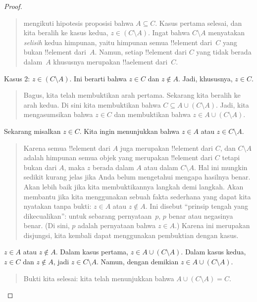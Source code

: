 \documentclass[../../../include/open-logic-section]{subfiles}
\begin{document}
\begin{proof}
\begin{quote}
    mengikuti hipotesis proposisi bahwa $A \subseteq C$. Kasus pertama
    selesai, dan kita beralih ke kasus kedua, $z \in (C \setminus A)$.
    Ingat bahwa $C \setminus A$ menyatakan \emph{selisih} kedua
    himpunan, yaitu himpunan semua !!{element} dari~$C$ yang bukan
    !!{element} dari~$A$. Namun, setiap !!{element} dari $C$ yang tidak
    berada dalam~$A$ khususnya merupakan !!a{element} dari~$C$.
  \end{quote}
  Kasus 2: $z \in (C \setminus A)$. Ini berarti bahwa $z \in C$ dan $z
  \notin A$. Jadi, khususnya, $z \in C$.
  \begin{quote}
    Bagus, kita telah membuktikan arah pertama. Sekarang kita beralih
    ke arah kedua. Di sini kita membuktikan bahwa $C \subseteq A \cup
    (C \setminus A)$. Jadi, kita mengasumsikan bahwa $z \in C$ dan
    membuktikan bahwa $z \in A \cup (C \setminus A)$.
  \end{quote}
  Sekarang misalkan $z \in C$. Kita ingin menunjukkan bahwa $z \in A$
  atau $z \in C \setminus A$.
  \begin{quote}
    Karena semua !!{element} dari $A$ juga merupakan !!{element} dari
    $C$, dan $C \setminus A$ adalah himpunan semua objek yang merupakan
    !!{element} dari $C$ tetapi bukan dari $A$, maka $z$ berada dalam
    $A$ atau dalam $C \setminus A$. Hal ini mungkin sedikit kurang
    jelas jika Anda belum mengetahui mengapa hasilnya benar. Akan
    lebih baik jika kita membuktikannya langkah demi langkah. Akan
    membantu jika kita menggunakan sebuah fakta sederhana yang dapat
    kita nyatakan tanpa bukti: $z \in A$ atau $z \notin A$. Ini disebut
    ``prinsip tengah yang dikecualikan'': untuk sebarang pernyataan~$p$,
    $p$ benar atau negasinya benar. (Di sini, $p$ adalah pernyataan
    bahwa $z \in A$.) Karena ini merupakan disjungsi, kita kembali
    dapat menggunakan pembuktian dengan kasus.
  \end{quote}
  $z \in A$ atau $z \notin A$. Dalam kasus pertama, $z \in A \cup (C
  \setminus A)$. Dalam kasus kedua, $z \in C$ dan $z \notin A$, jadi
  $z \in C \setminus A$. Namun, dengan demikian $z \in A \cup (C
  \setminus A)$.
  \begin{quote}
    Bukti kita selesai: kita telah menunjukkan bahwa $A \cup (C
    \setminus A) = C$.
  \end{quote}
\end{proof}
\end{document}
